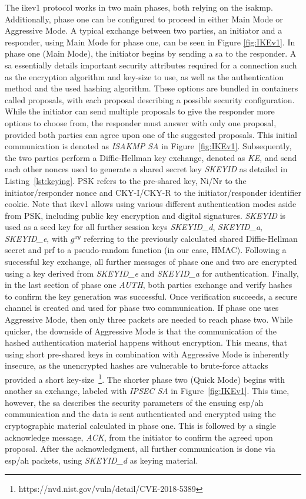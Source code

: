 The \ac{ike}v1 protocol works in two main phases, both relying on the \ac{isakmp}. Additionally, phase one can be configured to proceed in either Main Mode or Aggressive Mode. A typical exchange between two parties, an initiator and a responder, using Main Mode for phase one, can be seen in Figure \ref{fig:IKEv1}. In phase one (Main Mode), the initiator begins by sending a \ac{sa} to the responder. A \ac{sa} essentially details important security attributes required for a connection such as the encryption algorithm and key-size to use, as well as the authentication method and the used hashing algorithm. These options are bundled in containers called proposals, with each proposal describing a possible security configuration. While the initiator can send multiple proposals to give the responder more options to choose from, the responder must answer with only one proposal, provided both parties can agree upon one of the suggested proposals. This initial communication is denoted as \emph{ISAKMP SA} in Figure~\ref{fig:IKEv1}. Subsequently, the two parties perform a Diffie-Hellman key exchange, denoted as \emph{KE}, and send each other nonces used to generate a shared secret key \emph{SKEYID} as detailed in Listing~\ref{lst:keying}. PSK refers to the pre-shared key, Ni/Nr to the initiator/responder nonce and CKY-I/CKY-R to the initiator/responder identifier cookie. Note that \ac{ike}v1 allows using various different authentication modes aside from PSK, including public key encryption and digital signatures. \emph{SKEYID} is used as a seed key for all further session keys \emph{SKEYID\_d}, \emph{SKEYID\_a}, \emph{SKEYID\_e}, with $g^{xy}$ referring to the previously calculated shared Diffie-Hellman secret and prf to a pseudo-random function (in our case, HMAC). Following a successful key exchange, all further messages of phase one and two are encrypted using a key derived from \emph{SKEYID\_e} and \emph{SKEYID\_a} for authentication. Finally, in the last section of phase one \emph{AUTH}, both parties exchange and verify hashes to confirm the key generation was successful. Once verification succeeds, a secure channel is created and used for phase two communication. If phase one uses Aggressive Mode, then only three packets are needed to reach phase two. While quicker, the downside of Aggressive Mode is that the communication of the hashed authentication material happens without encryption. This means, that using short pre-shared keys in combination with Aggressive Mode is inherently insecure, as the unencrypted hashes are vulnerable to brute-force attacks provided a short key-size~\footnote{https://nvd.nist.gov/vuln/detail/CVE-2018-5389}. The shorter phase two (Quick Mode) begins with another \ac{sa} exchange, labeled with \emph{IPSEC SA} in Figure~\ref{fig:IKEv1}. This time, however, the \ac{sa} describes the security parameters of the ensuing \ac{esp}/\ac{ah} communication and the data is sent authenticated and encrypted using the cryptographic material calculated in phase one. This is followed by a single acknowledge message, \emph{ACK}, from the initiator to confirm the agreed upon proposal. After the acknowledgment, all further communication is done via \ac{esp}/\ac{ah} packets, using \emph{SKEYID\_d} as keying material.

